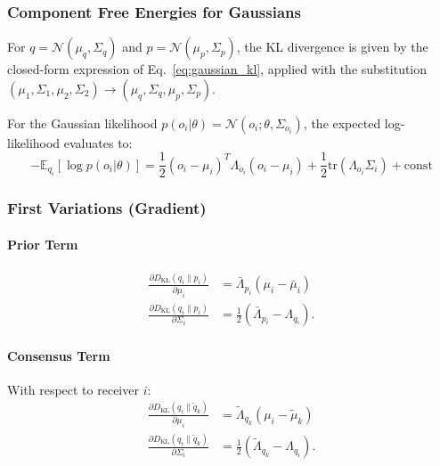 \documentclass[11pt]{article}
\begin{document}
\subsubsection{Component Free Energies for Gaussians}

For $q = \mathcal{N}(\mu_q, \Sigma_q)$ and $p = \mathcal{N}(\mu_p, \Sigma_p)$, the KL divergence is given by the closed-form expression of Eq.~\eqref{eq:gaussian_kl}, applied with the substitution $(\mu_1, \Sigma_1, \mu_2, \Sigma_2) \to (\mu_q, \Sigma_q, \mu_p, \Sigma_p)$.

For the Gaussian likelihood $p(o_i | \theta) = \mathcal{N}(o_i; \theta, \Sigma_{o_i})$, the expected log-likelihood evaluates to:
\begin{equation}
-\mathbb{E}_{q_i}[\log p(o_i | \theta)] = \frac{1}{2}(o_i - \mu_i)^T \Lambda_{o_i}(o_i - \mu_i) + \frac{1}{2}\mathrm{tr}(\Lambda_{o_i}\Sigma_i) + \mathrm{const}
\end{equation}

\subsubsection{First Variations (Gradient)}

\paragraph{Prior Term}
\begin{align}
\frac{\partial D_{\mathrm{KL}}(q_i \| p_i)}{\partial \mu_i} &= \bar{\Lambda}_{p_i}(\mu_i - \bar{\mu}_i) \\
\frac{\partial D_{\mathrm{KL}}(q_i \| p_i)}{\partial \Sigma_i} &= \frac{1}{2}(\bar{\Lambda}_{p_i} - \Lambda_{q_i}).
\end{align}

\paragraph{Consensus Term}

With respect to receiver $i$:
\begin{align}
\frac{\partial D_{\mathrm{KL}}(q_i \| \tilde{q}_k)}{\partial \mu_i} &= \tilde{\Lambda}_{q_k}(\mu_i - \tilde{\mu}_k) \\
\frac{\partial D_{\mathrm{KL}}(q_i \| \tilde{q}_k)}{\partial \Sigma_i} &= \frac{1}{2}(\tilde{\Lambda}_{q_k} - \Lambda_{q_i}).
\end{align}
\end{document}
